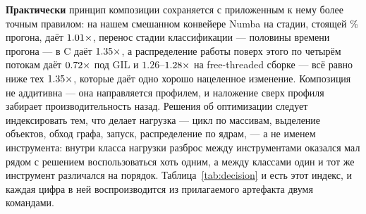 \textbf{Практически} принцип композиции сохраняется с приложенным к нему более точным правилом: на
нашем смешанном конвейере Numba на стадии, стоящей \% прогона, даёт $\meas{ratio:b7_pipeline-gil:end_to_end/gil/v0_pure|b7_pipeline-gil:end_to_end/gil/v1_numba}{1.01}\times$, перенос
стадии классификации --- половины времени прогона --- в C даёт $\meas{ratio:b7_pipeline-gil:end_to_end/gil/v0_pure|b7_pipeline-gil:end_to_end/gil/v2_numba_native}{1.35}\times$, а распределение работы
поверх этого по четырём потокам даёт $\meas{ratio:b7_pipeline-gil:end_to_end/gil/v0_pure|b7_pipeline-gil:end_to_end/gil/v3_native_threads}{0.72}\times$ под GIL и $1.26$--$\meas{ratio:b7_pipeline-ft:end_to_end/ft/v0_pure|b7_pipeline-ft:end_to_end/ft/v3_native_threads}{1.28}\times$ на free-threaded
сборке --- всё равно ниже тех $\meas{ratio:b7_pipeline-gil:end_to_end/gil/v0_pure|b7_pipeline-gil:end_to_end/gil/v2_numba_native}{1.35}\times$, которые даёт одно хорошо нацеленное изменение.
Композиция не аддитивна --- она направляется профилем, и наложение сверх профиля забирает
производительность назад. Решения об оптимизации следует индексировать тем, что делает нагрузка ---
цикл по массивам, выделение объектов, обход графа, запуск, распределение по ядрам, --- а не именем
инструмента: внутри класса нагрузки разброс между инструментами оказался мал
рядом с решением воспользоваться хоть одним, а между классами один и тот же инструмент различался
на порядок.
Таблица~\ref{tab:decision} и есть этот индекс, и каждая цифра в ней воспроизводится из
прилагаемого артефакта двумя командами.
